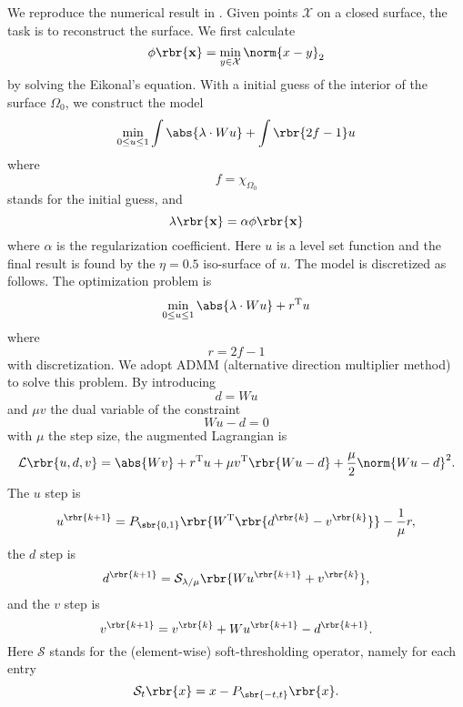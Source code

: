 \documentclass[english, nochinese]{pnote}
\begin{document}
We reproduce the numerical result in \parencite{dong_wavelet_2011}. Given points $\mathcal{X}$ on a closed surface, the task is to reconstruct the surface. We first calculate
\begin{equation}
\phi \rbr{\mathbf{x}} = \min_{ y \in \mathcal{X} } \norm{ x - y }_2
\end{equation}
by solving the Eikonal's equation. With a initial guess of the interior of the surface $\Omega_0$, we construct the model
\begin{equation}
\min_{ 0 \le u \le  1 } \int \abs{ \lambda \cdot W u } + \int \rbr{ 2 f - 1 } u
\end{equation}
where
\begin{equation}
f = \chi_{\Omega_0}
\end{equation}
stands for the initial guess, and
\begin{equation}
\lambda \rbr{\mathbf{x}} = \alpha \phi \rbr{\mathbf{x}}
\end{equation}
where $\alpha$ is the regularization coefficient. Here $u$ is a level set function and the final result is found by the $ \eta = 0.5 $ iso-surface of $u$. The model is discretized as follows. The optimization problem is
\begin{equation}
\min_{ 0 \le u \le 1 } \abs{ \lambda \cdot W u } + r^{\text{T}} u
\end{equation}
where
\begin{equation}
r = 2 f - 1
\end{equation}
with discretization. We adopt ADMM (alternative direction multiplier method) to solve this problem. By introducing
\begin{equation}
d = W u
\end{equation}
and $ \mu v $ the dual variable of the constraint
\begin{equation}
W u - d = 0
\end{equation}
with $\mu$ the step size, the augmented Lagrangian is
\begin{equation}
\mathcal{L} \rbr{ u, d, v } = \abs{ W v } + r^{\text{T}} u + \mu v^{\text{T}} \rbr{ W u - d } + \frac{\mu}{2} \norm{ W u - d }^2.
\end{equation}
The $u$ step is
\begin{equation}
u^{\rbr{ k + 1 }} = P_{\sbr{ 0, 1 }} \rbr{ W^{\text{T}} \rbr{ d^{\rbr{k}} - v^{\rbr{k}} } } - \frac{1}{\mu} r,
\end{equation}
the $d$ step is
\begin{equation}
d^{\rbr{ k + 1 }} = \mathcal{S}_{ \lambda / \mu } \rbr{ W u^{\rbr{ k + 1 }} + v^{\rbr{k}} },
\end{equation}
and the $v$ step is
\begin{equation}
v^{\rbr{ k + 1 }} = v^{\rbr{k}} + W u^{\rbr{ k + 1 }} - d^{\rbr{ k + 1 }}.
\end{equation}
Here $\mathcal{S}$ stands for the (element-wise) soft-thresholding operator, namely for each entry
\begin{equation}
\mathcal{S}_t \rbr{x} = x - P_{\sbr{ -t, t }} \rbr{x}.
\end{equation}
\end{document}
